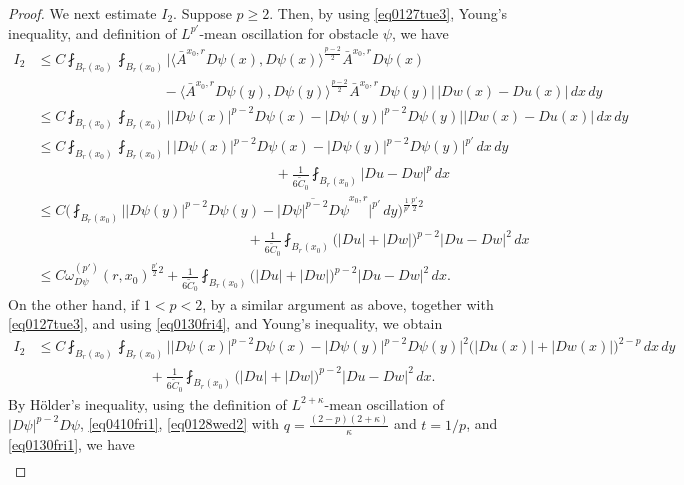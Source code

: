 \documentclass[reqno]{amsart}
\numberwithin{equation}{section}
\theoremstyle{plain}
\theoremstyle{definition}
\theoremstyle{remark}
\providecommand{\abs}[1]{\lvert#1\rvert}
\providecommand{\ip}[1]{\langle#1\rangle}
\begin{document}
\begin{proof}
We next estimate $I_2$. Suppose $p\geq 2$.
Then, by using \eqref{eq0127tue3}, Young's inequality, and definition of $L^{p'}$-mean oscillation for obstacle $\psi$, we have
\begin{align*}
I_2
&\leq C \fint_{B_r(x_0)}  \fint_{B_r(x_0)}\big| \ip{\bar{A}^{x_0,r} D\psi(x), D\psi (x)}^{\frac{p-2}{2}} \bar{A}^{x_0,r} D\psi(x)\\
&\qquad \qquad\qquad\qquad\quad  - \ip{\bar{A}^{x_0,r} D\psi(y), D\psi(y) }^{\frac{p-2}{2}} \bar{A}^{x_0,r} D\psi(y) \big| \,\abs{Dw(x)-Du(x)}\,dx\,dy\\
&\leq C \fint_{B_r(x_0)}  \fint_{B_r(x_0)}   \big| \abs{D\psi(x)}^{p-2}D\psi(x)-\abs{D\psi(y)}^{p-2}D\psi(y) \big|\abs{Dw(x)-Du(x)}\,dx\,dy\\
&\leq C\fint_{B_r(x_0)}  \fint_{B_r(x_0)}   \big| \,\abs{D\psi(x)}^{p-2}D\psi(x)-\abs{D\psi(y)}^{p-2}D\psi(y) \big|^{p'}\,dx\,dy\\
&\qquad  \qquad\qquad\qquad \qquad\qquad\qquad\qquad\quad +\frac{1}{6\tilde C_0} \fint_{B_r(x_0)}   \abs{Du-Dw}^p \,dx\\
&\leq  C \bigg(  \fint_{B_r(x_0)}  \big| \abs{D\psi(y)}^{p-2}D\psi(y)-\overline{\abs{D\psi}^{p-2}D\psi}^{x_0,r} \big|^{p'}\,dy\bigg)^{\frac{1}{p'}\frac{p'}{2}2}\\
&\qquad \qquad \qquad\qquad \qquad\qquad\qquad\quad +\frac{1}{6\tilde C_0} \fint_{B_r(x_0)} \big(  \abs{Du}+\abs{Dw} \big)^{p-2}\abs{Du-Dw}^2\, dx\\
&\leq  C \omega_{D\psi}^{(p')}(r,x_0)^{\frac{p'}{2}2}+ \frac{1}{6 \tilde C_0} \fint_{B_r(x_0)} \big(  \abs{Du}+\abs{Dw} \big)^{p-2}\abs{Du-Dw}^2 \,dx.
\end{align*}
On the other hand, if $1<p<2$,  by a similar argument as above, together with \eqref{eq0127tue3}, and using \eqref{eq0130fri4}, and Young's inequality, we obtain
\begin{align*}
I_2&\leq   C\fint_{B_r(x_0)}  \fint_{B_r(x_0)}   \big| \abs{D\psi(x)}^{p-2}D\psi(x)-\abs{D\psi(y)}^{p-2}D\psi(y) \big|^{2} \big( \abs{Du(x)}+\abs{Dw(x)}\big)^{2-p}\,dx\,dy \\
&\qquad\qquad\qquad\qquad+ \frac{1}{6\tilde C_0} \fint_{B_r(x_0)} \big(  \abs{Du}+\abs{Dw} \big)^{p-2}\abs{Du-Dw}^2 \,dx.
\end{align*}
By H\"{o}lder's inequality, using the definition of $L^{2+\kappa}$-mean oscillation of $|D\psi|^{p-2}D\psi$, \eqref{eq0410fri1}, \eqref{eq0128wed2} with $q= \frac{(2-p)(2+\kappa)}{\kappa}$ and $t=1/p$, and \eqref{eq0130fri1}, we have
\begin{align*}

\end{align*}
\end{proof}
\end{document}
